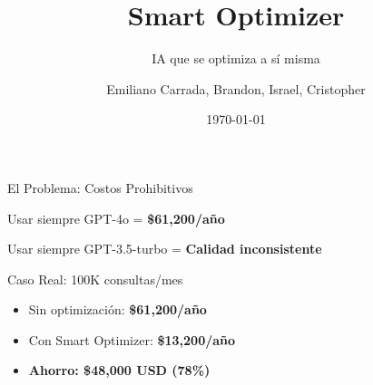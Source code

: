 \documentclass[aspectratio=169,14pt]{beamer}
\title[Smart Optimizer]{Smart Optimizer}
\subtitle{IA que se optimiza a sí misma}
\author[Equipo]{Emiliano Carrada, Brandon, Israel, Cristopher}
\institute{Hackathon Kavak x OpenAI 2025}
\date{\today}
\begin{document}
\begin{frame}
\titlepage
\end{frame}

\begin{frame}{El Problema: Costos Prohibitivos}

\begin{center}
\LARGE
Usar siempre GPT-4o = \textcolor{mainred}{\textbf{\$61,200/año}}

\vspace{0.5cm}

Usar siempre GPT-3.5-turbo = \textcolor{mainorange}{\textbf{Calidad inconsistente}}
\end{center}

\vspace{1cm}

\begin{block}{Caso Real: 100K consultas/mes}
\begin{itemize}
    \item Sin optimización: \textcolor{mainred}{\textbf{\$61,200/año}}
    \item Con Smart Optimizer: \textcolor{maingreen}{\textbf{\$13,200/año}}
    \item \textbf{Ahorro: \$48,000 USD (78\%)}
\end{itemize}
\end{block}

\end{frame}
\end{document}
